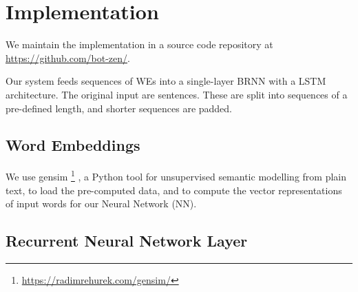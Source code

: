 \documentclass[11pt,a4paper]{article}
\begin{document}
\section{Implementation} %
\label{sec:implementation}


We maintain the implementation in a source code repository at
\url{https://github.com/bot-zen/}.  

Our system feeds sequences of WEs into a single-layer BRNN with a LSTM architecture. The original input are sentences. These are split into sequences of a pre-defined length, and shorter sequences are padded.


\subsection{Word Embeddings} %


We use gensim%
\footnote{\url{https://radimrehurek.com/gensim/}}%
, a Python tool for unsupervised semantic modelling from plain text, to load
the pre-computed data, and to compute the vector representations of
input words for our Neural Network (NN).

\subsection{Recurrent Neural Network Layer} %
\end{document}
